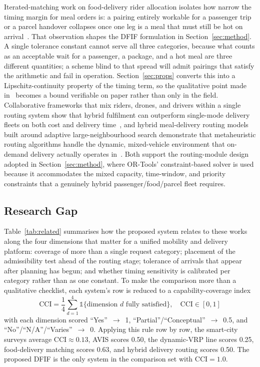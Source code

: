 \documentclass[conference]{IEEEtran}
\begin{document}
Iterated-matching work on food-delivery rider allocation isolates how narrow
the timing margin for meal orders is: a pairing entirely workable for a
passenger trip or a parcel handover collapses once one leg is a meal that must
still be hot on arrival~\cite{chen2022}. That observation shapes the DFIF
formulation in Section~\ref{sec:method}. A single tolerance constant cannot
serve all three categories, because what counts as an acceptable wait for a
passenger, a package, and a hot meal are three different quantities; a scheme
blind to that spread will admit pairings that satisfy the arithmetic and fail
in operation. Section~\ref{sec:props} converts this into a Lipschitz-continuity
property of the timing term, so the qualitative point made in~\cite{chen2022}
becomes a bound verifiable on paper rather than only in the field. Collaborative frameworks that mix riders, drones,
and drivers within a single routing system show that hybrid fulfilment can
outperform single-mode delivery fleets on both cost and delivery
time~\cite{lu}, and hybrid meal-delivery routing models built around adaptive
large-neighbourhood search demonstrate that metaheuristic routing algorithms
handle the dynamic, mixed-vehicle environment that on-demand delivery
actually operates in~\cite{liu2025}. Both support the routing-module design
adopted in Section~\ref{sec:method}, where OR-Tools' constraint-based solver
is used because it accommodates the mixed capacity, time-window, and priority
constraints that a genuinely hybrid passenger/food/parcel fleet requires.

\subsection{Research Gap}
Table~\ref{tab:related} summarises how the proposed system relates to these
works along the four dimensions that matter for a unified mobility and
delivery platform: coverage of more than a single request category; placement of the
admissibility test ahead of the routing stage; tolerance of arrivals that
appear after planning has begun; and whether timing sensitivity is calibrated
per category rather than as one constant. To make the comparison more than a qualitative checklist, each
system's row is reduced to a capability-coverage index
\begin{equation}
\mathrm{CCI}=\frac{1}{4}\sum_{d=1}^{4}
\mathbb{1}\{\text{dimension } d \text{ fully satisfied}\},
\quad \mathrm{CCI}\in[0,1]
\end{equation}
with each dimension scored ``Yes''~$\rightarrow$~1,
``Partial''/``Conceptual''~$\rightarrow$~0.5, and
``No''/``N/A''/``Varies''~$\rightarrow$~0. Applying this rule row by row, the
smart-city surveys average $\mathrm{CCI}\approx0.13$, AVIS scores 0.50, the
dynamic-VRP line scores 0.25, food-delivery matching scores 0.63, and hybrid
delivery routing scores 0.50. The proposed DFIF is the only system in the
comparison set with $\mathrm{CCI}=1.0$.
\end{document}
